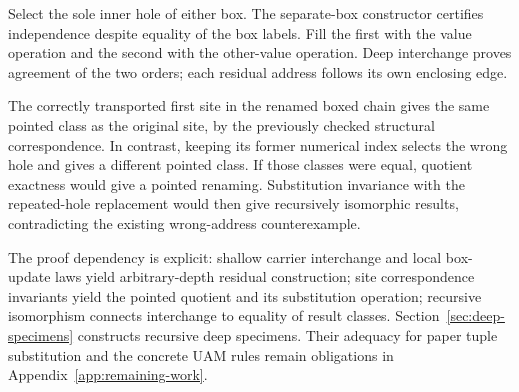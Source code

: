Select the sole inner hole of either box. The separate-box constructor
certifies independence despite equality of the box labels. Fill the
first with the value operation and the second with the other-value
operation. Deep interchange proves agreement of the two orders; each
residual address follows its own enclosing edge.

The correctly transported first site in the renamed boxed chain gives
the same pointed class as the original site, by the previously checked
structural correspondence. In contrast, keeping its former numerical
index selects the wrong hole and gives a different pointed class.
If those classes were equal, quotient exactness would give a pointed
renaming. Substitution invariance with the repeated-hole replacement
would then give recursively isomorphic results, contradicting the
existing wrong-address counterexample.

The proof dependency is explicit: shallow carrier interchange and local
box-update laws yield arbitrary-depth residual construction; site
correspondence invariants yield the pointed quotient and its substitution
operation; recursive isomorphism connects interchange to equality of
result classes. Section~\ref{sec:deep-specimens} constructs recursive deep
specimens. Their adequacy for paper tuple substitution and the concrete UAM
rules remain obligations in Appendix~\ref{app:remaining-work}.
